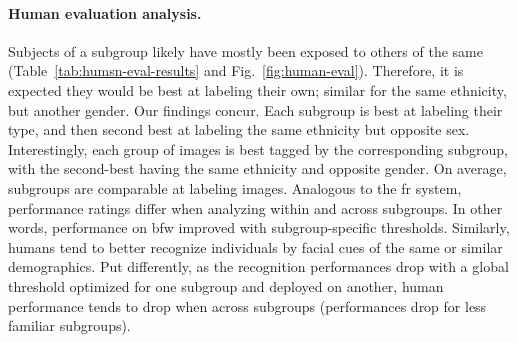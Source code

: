 \noindent\paragraph{Human evaluation analysis.}
Subjects of a subgroup likely have mostly been exposed to others of the same (Table~\ref{tab:humsn-eval-results} and Fig.~\ref{fig:human-eval}). Therefore, it is expected they would be best at labeling their own; similar for the same ethnicity, but another gender. Our findings concur. Each subgroup is best at labeling their type, and then second best at labeling the same ethnicity but opposite sex. Interestingly, each group of images is best tagged by the corresponding subgroup, with the second-best having the same ethnicity and opposite gender. On average, subgroups are comparable at labeling images. Analogous to the \gls{fr} system, performance ratings differ when analyzing within and across subgroups. In other words, performance on \gls{bfw} improved with subgroup-specific thresholds. Similarly, humans tend to better recognize individuals by facial cues of the same or similar demographics. Put differently, as the recognition performances drop with a global threshold optimized for one subgroup and deployed on another, human performance tends to drop when across subgroups (\ie performances drop for less familiar subgroups).
 